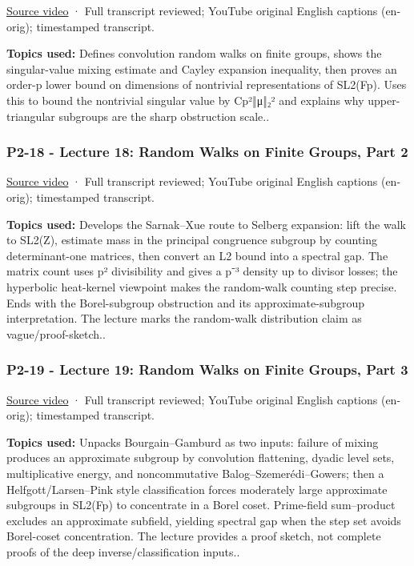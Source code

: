 \href{https://www.youtube.com/watch?v=QVDLMx0Guiw}{Source video} · Full transcript reviewed; YouTube original English captions (en-orig); timestamped transcript.

\textbf{Topics used:} Defines convolution random walks on finite groups, shows the singular-value mixing estimate and Cayley expansion inequality, then proves an order-p lower bound on dimensions of nontrivial representations of SL2(Fp). Uses this to bound the nontrivial singular value by Cp²‖μ‖₂² and explains why upper-triangular subgroups are the sharp obstruction scale..

\subsubsection{P2-18 - Lecture 18: Random Walks on Finite Groups, Part 2}\label{04-visual-computing-ii-ch036-p2-18---lecture-18-random-walks-on-finite-groups-part-2}

\href{https://www.youtube.com/watch?v=_jSFwF8rMdY}{Source video} · Full transcript reviewed; YouTube original English captions (en-orig); timestamped transcript.

\textbf{Topics used:} Develops the Sarnak--Xue route to Selberg expansion: lift the walk to SL2(Z), estimate mass in the principal congruence subgroup by counting determinant-one matrices, then convert an L2 bound into a spectral gap. The matrix count uses p² divisibility and gives a p⁻³ density up to divisor losses; the hyperbolic heat-kernel viewpoint makes the random-walk counting step precise. Ends with the Borel-subgroup obstruction and its approximate-subgroup interpretation. The lecture marks the random-walk distribution claim as vague/proof-sketch..

\subsubsection{P2-19 - Lecture 19: Random Walks on Finite Groups, Part 3}\label{04-visual-computing-ii-ch036-p2-19---lecture-19-random-walks-on-finite-groups-part-3}

\href{https://www.youtube.com/watch?v=bBzcaYNAfcI}{Source video} · Full transcript reviewed; YouTube original English captions (en-orig); timestamped transcript.

\textbf{Topics used:} Unpacks Bourgain--Gamburd as two inputs: failure of mixing produces an approximate subgroup by convolution flattening, dyadic level sets, multiplicative energy, and noncommutative Balog--Szemerédi--Gowers; then a Helfgott/Larsen--Pink style classification forces moderately large approximate subgroups in SL2(Fp) to concentrate in a Borel coset. Prime-field sum--product excludes an approximate subfield, yielding spectral gap when the step set avoids Borel-coset concentration. The lecture provides a proof sketch, not complete proofs of the deep inverse/classification inputs..


